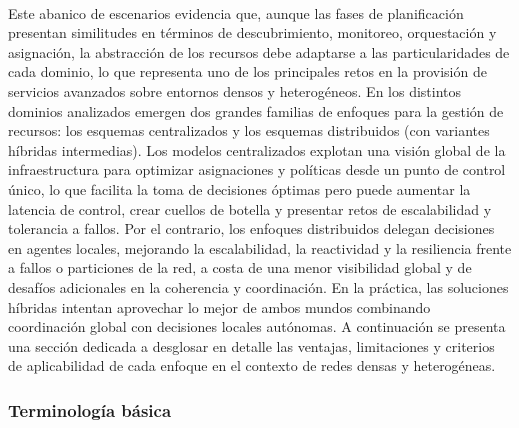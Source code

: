 \\
Este abanico de escenarios evidencia que, aunque las fases de planificación presentan similitudes en términos de descubrimiento, monitoreo, orquestación y asignación, la abstracción de los recursos debe adaptarse a las particularidades de cada dominio, lo que representa uno de los principales retos en la provisión de servicios avanzados sobre entornos densos y heterogéneos. En los distintos dominios analizados emergen dos grandes familias de enfoques para la gestión de recursos: los esquemas centralizados y los esquemas distribuidos (con variantes híbridas intermedias). Los modelos centralizados explotan una visión global de la infraestructura para optimizar asignaciones y políticas desde un punto de control único, lo que facilita la toma de decisiones óptimas pero puede aumentar la latencia de control, crear cuellos de botella y presentar retos de escalabilidad y tolerancia a fallos. Por el contrario, los enfoques distribuidos delegan decisiones en agentes locales, mejorando la escalabilidad, la reactividad y la resiliencia frente a fallos o particiones de la red, a costa de una menor visibilidad global y de desafíos adicionales en la coherencia y coordinación. En la práctica, las soluciones híbridas intentan aprovechar lo mejor de ambos mundos combinando coordinación global con decisiones locales autónomas. A continuación se presenta una sección dedicada a desglosar en detalle las ventajas, limitaciones y criterios de aplicabilidad de cada enfoque en el contexto de redes densas y heterogéneas.

\subsubsection{Terminología básica}

